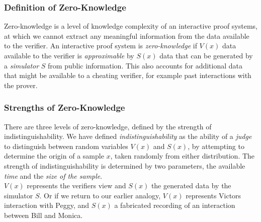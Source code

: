 %
%

\subsubsection{Definition of Zero-Knowledge}
Zero-knowledge is a level of knowledge complexity of an interactive proof systems, at which we cannot extract any meaningful information from the data available to the verifier.
\bigskip
\newline
An interactive proof system is \textit{zero-knowledge} if $V(x)$ data available to the verifier is \textit{approximable} by $S(x)$ data that can be generated by a \textit{simulator} $S$ from public information.
This also accounts for additional data that might be available to a cheating verifier, for example past interactions with the prover.

\subsubsection{Strengths of Zero-Knowledge}
There are three levels of zero-knowledge, defined by the strength of indistinguishability.
We have defined \textit{indistinguishability} as the ability of a \textit{judge} to distinguish between random variables $V(x)$ and $S(x)$, by attempting to determine the origin of a sample $x$, taken randomly from either distribution.
The strength of indistinguishability is determined by two parameters, the available \textit{time} and the \textit{size of the sample}.\\
\newline
$V(x)$ represents the verifiers view and $S(x)$ the generated data by the simulator $S$. Or if we return to our earlier analogy, $V(x)$ represents Victors interaction with Peggy, and $S(x)$ a fabricated recording of an interaction between Bill and Monica.

